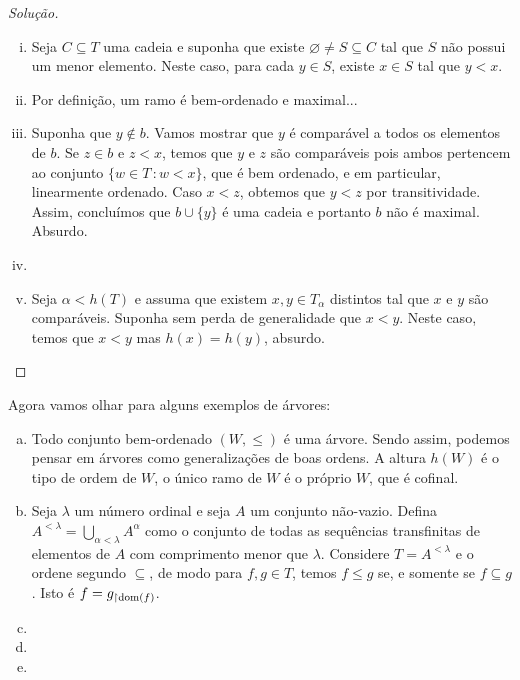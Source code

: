 \documentclass[a4paper]{article}
\begin{document}
  \begin{proof}[Solução]\hfill
    \begin{enumerate}[(i)]
      \item  Seja \(C\subseteq T\) uma cadeia e suponha que existe
        \(\varnothing\not = S\subseteq C\) tal que \(S\) não possui um menor
        elemento. Neste caso, para cada \(y\in S\), existe \(x\in S\) tal que \(y <x\).
      \item Por definição, um ramo é bem-ordenado e maximal...
      \item Suponha que \(y\not\in b\). Vamos mostrar que \(y\) é comparável
        a todos os elementos de \(b\). Se \(z\in b\) e \(z < x\), temos que
        \(y\) e \(z\) são comparáveis pois ambos pertencem ao conjunto \(\{w\in
        T\,\colon w< x \}\), que é bem ordenado, e em particular, linearmente
        ordenado. Caso \(x<z\), obtemos que \(y<z\) por transitividade. Assim,
        concluímos que \(b\cup\{y\}\) é uma cadeia e portanto \(b\) não é
        maximal. Absurdo.
      \item
        \item Seja \(\alpha < h(T)\) e assuma que existem \(x,y\in T_\alpha\)
          distintos tal que \(x\) e \(y\) são comparáveis.
          Suponha sem perda de generalidade que
      \(x<y\). Neste caso, temos que \(x<y\) mas \(h(x)=h(y)\), absurdo.\qedhere
  \end{enumerate}
  \end{proof}

  Agora vamos olhar para alguns exemplos de árvores:
  \begin{exemplo}\hfill
    \begin{enumerate}[(a)]
    \item Todo conjunto bem-ordenado \((W,\leq)\) é uma árvore. Sendo assim,
      podemos pensar em árvores como generalizações de boas ordens. A altura
      \(h(W)\) é o tipo de ordem de \(W\), o único ramo de \(W\) é o próprio
      \(W\), que é cofinal.
    \item Seja \(\lambda\) um número ordinal e seja \(A\) um conjunto não-vazio.
      Defina \(A^{< \lambda}=\bigcup_{\alpha < \lambda} A^\alpha\) como o
      conjunto de todas as sequências transfinitas de elementos de \(A\) com
      comprimento menor que \(\lambda\). Considere \(T=A^{< \lambda}\) e o
      ordene segundo \(\subseteq\), de modo para \(f,g\in T\), temos \(f\leq g\)
      se, e somente se \(f\subseteq g\). Isto é \(f=g_{\upharpoonright \operatorname{dom}(f)}\).
    \item
    \item 
    \item 
    \end{enumerate}
  \end{exemplo}

  
  
\end{document}
